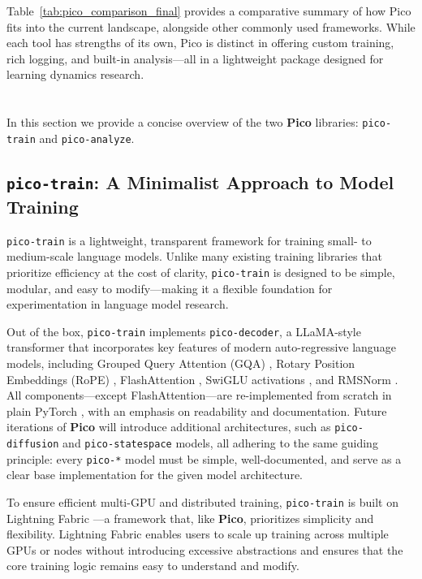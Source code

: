 Table~\ref{tab:pico_comparison_final} provides a comparative summary of how Pico fits into the current landscape, alongside other commonly used frameworks. While each tool has strengths of its own, Pico is distinct in offering custom training, rich logging, and built-in analysis—all in a lightweight package designed for learning dynamics research.

\section{\picolarge}

In this section we provide a concise overview of the two \textbf{Pico} libraries: \texttt{pico-train} and \texttt{pico-analyze}. 

\subsection{\texttt{pico-train}: A Minimalist Approach to Model Training}

\texttt{pico-train} is a lightweight, transparent framework for training small- to medium-scale language models. Unlike many existing training libraries that prioritize efficiency at the cost of clarity, \texttt{pico-train} is designed to be simple, modular, and easy to modify—making it a flexible foundation for experimentation in language model research.

Out of the box, \texttt{pico-train} implements \texttt{pico-decoder}, a LLaMA-style transformer \citep{touvron2023llama} that incorporates key features of modern auto-regressive language models, including Grouped Query Attention (GQA) \citep{ainslie2023gqa}, Rotary Position Embeddings (RoPE) \citep{su2024rope}, FlashAttention \citep{dao2022flashattention}, SwiGLU activations \citep{shazeer2020glu}, and RMSNorm \citep{zhang2019rmsnorm}. All components—except FlashAttention—are re-implemented from scratch in plain PyTorch \citep{paszke2017pytorch}, with an emphasis on readability and documentation. Future iterations of \textbf{Pico} will introduce additional architectures, such as \texttt{pico-diffusion} and \texttt{pico-statespace} models, all adhering to the same guiding principle: every \texttt{pico-*} model must be simple, well-documented, and serve as a clear base implementation for the given model architecture.

To ensure efficient multi-GPU and distributed training, \texttt{pico-train} is built on Lightning Fabric \citep{lightning-fabric}—a framework that, like \textbf{Pico}, prioritizes simplicity and flexibility. Lightning Fabric enables users to scale up training across multiple GPUs or nodes without introducing excessive abstractions and ensures that the core training logic remains easy to understand and modify.

